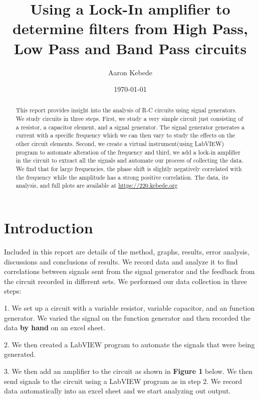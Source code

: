 \documentclass[twocolumn]{article}\usepackage[english]{babel}
\title{Using a Lock-In amplifier to determine filters from High Pass, Low Pass and Band Pass circuits }
\author{Aaron Kebede}
\date{\today}
\begin{document}
\maketitle
\begin{abstract}

This report provides insight into the analysis of R-C circuits using signal generators. We study circuits in three steps. First, we study a very simple circuit just consisting of a resistor, a capacitor element, and a signal generator. The signal generator generates a current with a specific frequency which we can then vary to study the effects on the other circuit elements. Second, we create a virtual instrument(using LabVIEW) program to automate alteration of the frequency and third, we add a lock-in amplifier in the circuit to extract all the signals and automate our process of collecting the data. We find that for large frequencies, the phase shift is slightly negatively correlated with the frequency while the amplitude has a strong positive correlation. The data, its analysis, and full plots are available at \url{https://220.kebede.org}

\end{abstract}

\section{Introduction}

Included in this report are details of the method, graphs, results, error analysis, discussions and conclusions of results. We record data and analyze it to find correlations between signals sent from the signal generator and the feedback from the circuit recorded in different sets.  
\newline
We performed our data collection in three steps:
\newline
\begin{Steps}
 \item{1. We set up a circuit with a variable resistor, variable capacitor, and  an function generator. We varied the signal on the function generator and then recorded the data \textbf{by hand} on an excel sheet.} \newline{}
 \item{2. We then created a LabVIEW program to automate the signals that were being generated. } \newline{}
 \item{3. We then add an amplifier to the circuit as shown in \textbf{Figure 1} below. We then send signals to the circuit using a LabVIEW program as in step 2. We record data automatically into an excel sheet and we start analyzing out output.}
 
\end{Steps}
\end{document}
